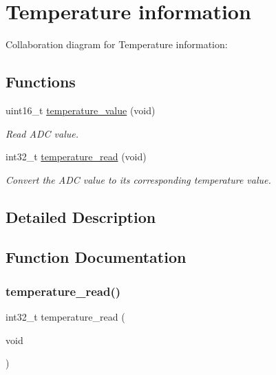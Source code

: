 \hypertarget{group___temperature___data}{}\section{Temperature information}
\label{group___temperature___data}
Collaboration diagram for Temperature information\+:
\subsection*{Functions}
\begin{DoxyCompactItemize}
\item 
uint16\+\_\+t \hyperlink{group___temperature___data_ga74915aedf88ee7840a64ab372d768ca1}{temperature\+\_\+value} (void)
\begin{DoxyCompactList}\small\item\em Read A\+DC value. \end{DoxyCompactList}\item 
int32\+\_\+t \hyperlink{group___temperature___data_gad2e261b9f6af30d5857f1e2a892a9592}{temperature\+\_\+read} (void)
\begin{DoxyCompactList}\small\item\em Convert the A\+DC value to its corresponding temperature value. \end{DoxyCompactList}\end{DoxyCompactItemize}


\subsection{Detailed Description}


\subsection{Function Documentation}
\mbox{\label{group___temperature___data_gad2e261b9f6af30d5857f1e2a892a9592}} 
\subsubsection{\texorpdfstring{temperature\+\_\+read()}{temperature\_read()}}
{\footnotesize\ttfamily int32\+\_\+t temperature\+\_\+read (\begin{DoxyParamCaption}\item[{void}]{ }\end{DoxyParamCaption})}



